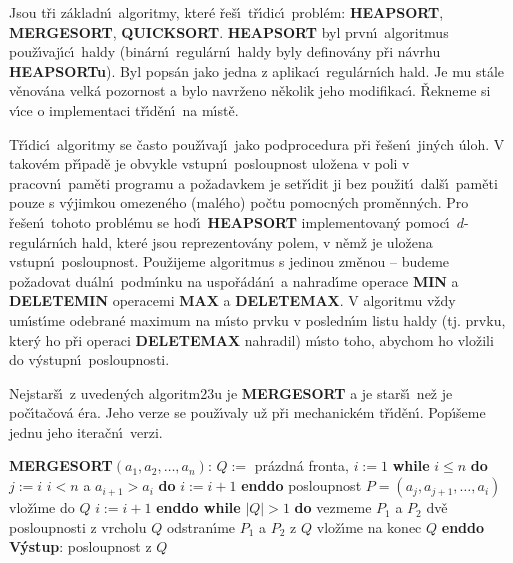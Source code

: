 \flushpar Jsou t\v ri z\'akladn\'\i\ algoritmy, kter\'e  \v re\v s\'\i\ t\v r\'\i dic\'\i\ 
probl\'em: {\bf HEAP\-SORT}, {\bf MERGESORT}, {\bf QUICKSORT}. 
{\bf HEAPSORT} byl prvn\'\i\ algoritmus pou\v z\'\i vaj\'\i c\'\i\ 
haldy (bin\'arn\'\i\ regul\'ar\-n\'\i\ haldy by\-ly definov\'any p\v ri 
n\'avrhu {\bf HEAP\-SORTu}). Byl pops\'an jako jedna z 
aplikac\'\i\ regul\'arn\'\i ch hald. Je mu  
st\'ale v\v enov\'ana velk\'a pozornost a bylo navr\v ze\-no n\v ekolik 
jeho modifikac\'\i . \v Rekneme si v\'\i ce o implementaci 
t\v r\'\i d\v en\'\i\ na m\'\i st\v e.
\medskip

\flushpar T\v r\'\i dic\'\i\ algoritmy se \v casto pou\v z\'\i vaj\'\i\ jako 
podprocedura p\v ri \v re\-\v se\-n\'\i\ jin\'ych \'uloh. V takov\'em p\v r\'\i pad\v e je 
obvykle vstupn\'\i\ posloupnost ulo\v zena v poli v pracovn\'\i\ 
pam\v eti programu a po\v za\-dav\-kem  je set\v r\'\i dit ji 
bez pou\v zit\'\i\ dal\v s\'\i\ 
pam\v eti pouze s v\'yjimkou omezen\'eho (mal\'eho) po\v ctu pomocn\'ych 
prom\v enn\'ych. Pro \v re\v se\-n\'\i\ tohoto probl\'emu se hod\'\i\ 
{\bf HEAPSORT} implementovan\'y pomoc\'\i\ 
$d$-regul\'arn\'\i ch hald, kter\'e jsou reprezentov\'any  
polem, v n\v em\v z je ulo\v zena vstupn\'\i\ posloupnost. Pou\v zijeme 
algoritmus s jedinou zm\v enou -- budeme po\v zadovat du\'aln\'\i\ 
podm\'\i nku na uspo\v r\'ad\'an\'\i\ 
a nahrad\'\i me operace {\bf MIN} a {\bf DELETEMIN }
ope\-racemi {\bf MAX} a {\bf DELETEMAX}. V algoritmu v\v zdy um\'\i st\'\i\-me 
odebran\'e maximum na m\'\i sto prvku v posled\-n\'\i m listu 
haldy (tj. prvku, kter\'y ho p\v ri operaci {\bf DELETEMAX }
nahradil) m\'\i sto toho, abychom ho vlo\v zili 
do v\'ystupn\'\i\ posloupnosti. 
\medskip

\flushpar Nejstar\v s\'\i\ z uveden\'ych algoritm\accent23u je 
{\bf MERGESORT} a je star\v s\'\i\ ne\v z je po\v c\'\i ta\v cov\'a \'era. Jeho 
verze se pou\v z\'\i valy u\v z p\v ri mecha\-nick\'em t\v r\'\i d\v en\'\i . Pop\'\i\v seme 
jednu jeho itera\v cn\'\i\ verzi. 
\bigskip

{\bf MERGESORT$(a_1,a_2,\dots,a_n)$}:\newline 
$Q:=$ pr\'azdn\'a fronta, $i:=1$\newline 
{\bf while} $i\le n$ {\bf do}\newline 
\phantom{---}$j:=i$\newline 
\phantom{---}{\bf while} $i<n$ a $a_{i+1}>a_i$ {\bf do} $i:=i+1$ {\bf enddo} \newline 
\phantom{---}posloupnost $P=(a_j,a_{j+1},\dots,a_i)$ vlo\v z\'\i me do $Q$\newline 
\phantom{---}$i:=i+1$\newline 
{\bf enddo\newline 
while} $|Q|>1$ {\bf do}\newline 
\phantom{---}vezmeme $P_1$ a $P_2$ dv\v e posloupnosti z vrcholu $Q$\newline 
\phantom{---}odstran\'\i me $P_1$ a $P_2$ z $Q$\newline 
\phantom{---}{\bf MERGE$(P_1,P_2)$} vlo\v z\'\i me na konec $Q$\newline 
{\bf enddo\newline 
V\'ystup}: posloupnost z $Q$
\bigskip

